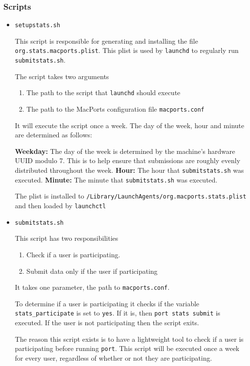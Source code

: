 \documentclass[10pt]{article}
\begin{document}
\subsubsection{Scripts}
\begin{itemize}
\item \texttt{setupstats.sh}

This script is responsible for generating and installing the file \texttt{org.stats.macports.plist}. This plist is used by \texttt{launchd} to regularly run \texttt{submitstats.sh}.

The script takes two arguments
\begin{enumerate}
  \item The path to the script that \texttt{launchd} should execute
  \item The path to the MacPorts configuration file \texttt{macports.conf}
\end{enumerate}

It will execute the script once a week. The day of the week, hour and minute are determined as follows: \newline


\textbf{Weekday:} The day of the week is determined by the machine's hardware UUID modulo 7. This is to help ensure that submissions are roughly evenly distributed throughout the week. \newline
\textbf{Hour: } The hour that \texttt{submitstats.sh} was executed. \newline
\textbf{Minute:} The minute that \texttt{submitstats.sh} was executed. \newline

The plist is installed to \texttt{/Library/LaunchAgents/org.macports.stats.plist} and then loaded by \texttt{launchctl}

\item \texttt{submitstats.sh}

This script has two responsibilities
\begin{enumerate}
  \item Check if a user is participating.
  \item Submit data only if the user if participating
\end{enumerate}
  
It takes one parameter, the path to \texttt{macports.conf}.

To determine if a user is participating it checks if the variable \texttt{stats\_participate} is set to \texttt{yes}. If it is, then \texttt{port stats submit} is executed. If the user is not participating then the script exits.

The reason this script exists is to have a lightweight tool to check if a user is participating before running \texttt{port}. This script will be executed once a week for every user, regardless of whether or not they are participating. 

\end{itemize}
\end{document}
